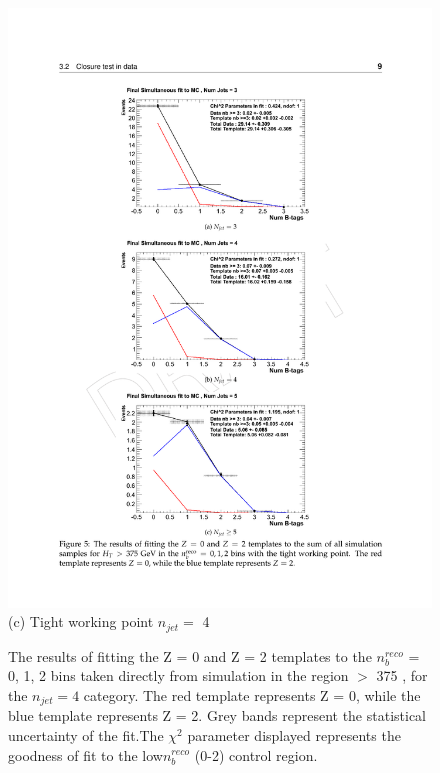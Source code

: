 \begin{figure}[ht]
\begin{minipage}[b]{0.55\linewidth}
\includegraphics[width = 1.0\linewidth]{plots/template_mc_high_njet4.pdf}
\centering (c) Tight working point $n_{jet} =$ 4 
\end{minipage}
\caption[The results of fitting the Z = 0 and Z = 2 templates to the $n_{b}^{reco}$ = 0, 1, 2 bins taken directly from simulation in the region \theht $>$ 375 \GeV, for the $n_{jet} = 4$ category.]{The results of fitting the Z = 0 and Z = 2 templates to the $n_{b}^{reco}$ = 0, 1, 2 bins taken directly from simulation in the region \theht $>$ 375 \GeV,  for the $n_{jet} = 4$ category. The red template represents Z = 0, while the blue template represents Z = 2. Grey bands represent the statistical uncertainty of the fit.The $\chi^{2}$ parameter displayed represents the goodness of fit to the low$ n_{b}^{reco}$ (0-2) control region.}
\label{fig:template_closure_high}
\end{figure}

